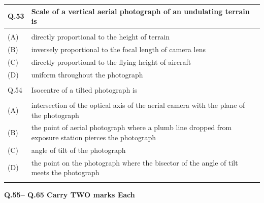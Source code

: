 \documentclass[12pt]{article}
\begin{document}
\begin{table}[H]
\renewcommand{\arraystretch}{3}
\setlength{\tabcolsep}{8pt}
\begin{tabular}{|l|p{15cm}|}
\hline
 
Q.53& Scale of a vertical aerial photograph of an undulating terrain is\\ \hline 
 & \\ \hline
(A)&directly proportional to the height of terrain\\ \hline
(B)&inversely proportional to the focal length of camera lens\\ \hline
(C)&directly proportional to the flying height of aircraft\\ \hline
(D)&uniform throughout the photograph\\ \hline
 & \\ \hline

Q.54 &Isocentre of a tilted photograph is\\ \hline
 & \\ \hline
(A)&intersection of the optical axis of the aerial camera with the plane of the photograph\\ \hline
(B)&the point of aerial photograph where a plumb line dropped from exposure station
pierces the photograph\\ \hline
(C)&angle of tilt of the photograph\\ \hline
(D)&the point on the photograph where the bisector of the angle of tilt meets the
photograph\\ \hline
& \\ \hline

\end{tabular}
\end{table}


\newpage

\textbf{Q.55– Q.65 Carry TWO marks Each}
\end{document}

